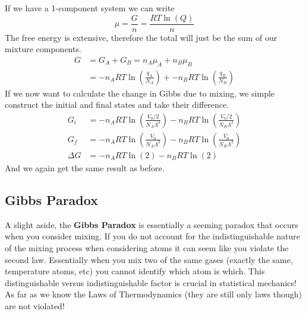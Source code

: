 \documentclass{article}
\begin{document}
If we have a 1-component system we can write 
\begin{equation}
    \mu = \frac{G}{n} = \frac{RT\ln(Q)}{n}
\end{equation}
The free energy is extensive, therefore the total will just be the sum of our mixture components.
\begin{equation}
    \begin{split}
        G &= G_A + G_B = n_A\mu_A + n_B\mu_B \\
        &= -n_ART\ln\left(\frac{q_A}{N_A}\right) + -n_BRT\ln\left(\frac{q_B}{N_B}\right)
    \end{split}
\end{equation}
If we now want to calculate the change in Gibbs due to mixing, we simple construct the initial and final states and take their difference. 
\begin{equation}
    \begin{split}
        G_i &= -n_ART\ln\left(\frac{V_0/2}{N_A\Lambda^3}\right) - n_BRT\ln\left(\frac{V_0/2}{N_B\Lambda^3}\right) \\
         G_f &= -n_ART\ln\left(\frac{V_0}{N_A\Lambda^3}\right) - n_BRT\ln\left(\frac{V_0}{N_B\Lambda^3}\right) \\
         \Delta G &= -n_ART\ln(2) - n_BRT\ln(2)
    \end{split}
\end{equation}
And we again get the same result as before. 

\subsection*{Gibbs Paradox}
A slight aside, the \textbf{Gibbs Paradox} is essentially a seeming paradox that occurs when you consider mixing.
If you do not account for the indistinguishable nature of the mixing process when considering atoms it can seem like you violate the second law. 
Essentially when you mix two of the same gases (exactly the same, temperature atoms, etc) you cannot identify which atom is which.
This distinguishable versus indistinguishable factor is crucial in statistical mechanics!
As far as we know the Laws of Thermodynamics (they are still only laws though) are not violated!
\end{document}
